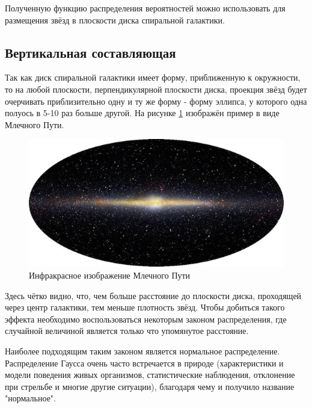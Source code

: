 Полученную функцию распределения вероятностей можно использовать для размещения звёзд в плоскости диска спиральной галактики.

\subsection{Вертикальная составляющая}

Так как диск спиральной галактики имеет форму, приближенную к окружности, то на любой плоскости, перпендикулярной плоскости диска, проекция звёзд будет очерчивать приблизительно одну и ту же форму - форму эллипса, у которого одна полуось в 5-10 раз больше другой. На рисунке \ref{img:miklyway} изображён пример в виде Млечного Пути.

\begin{figure}[H]
    \centering
	\includegraphics[scale=0.4]{image/MilkyWay.jpg}
	\caption{Инфракрасное изображение Млечного Пути}
	\label{img:miklyway}
\end{figure}
Здесь чётко видно, что, чем больше расстояние до плоскости диска, проходящей через центр галактики, тем меньше плотность звёзд. Чтобы добиться такого эффекта необходимо воспользоваться некоторым законом распределения, где случайной величиной является только что упомянутое расстояние.

Наиболее подходящим таким законом является нормальное распределение. Распределение Гаусса очень часто встречается в природе (характеристики и модели поведения живых организмов, статистические наблюдения, отклонение при стрельбе и многие другие ситуации), благодаря чему и получило название "нормальное".


